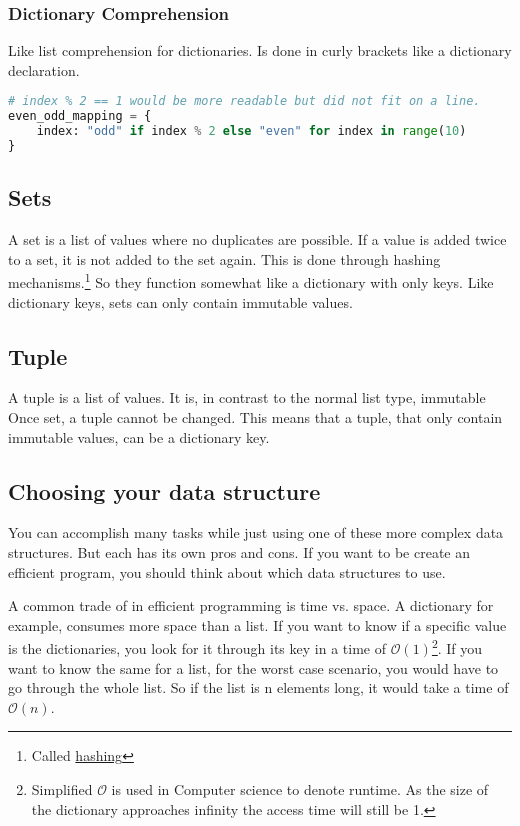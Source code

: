 \documentclass{article}
\begin{document}
\subsubsection{Dictionary Comprehension}

Like list comprehension for dictionaries.
Is done in curly brackets like a dictionary declaration.

\begin{lstlisting}[language=Python]
# index % 2 == 1 would be more readable but did not fit on a line.
even_odd_mapping = {
    index: "odd" if index % 2 else "even" for index in range(10)
}
\end{lstlisting}

\subsection{Sets}

A set is a list of values where no duplicates are possible.
If a value is added twice to a set, it is not added to the set again.
This is done through hashing mechanisms.\footnote{
    Called \href{https://en.wikipedia.org/wiki/Hash_function}{hashing}
}
So they function somewhat like a dictionary with only keys.
Like dictionary keys, sets can only contain immutable values.

\subsection{Tuple}

A tuple is a list of values.
It is, in contrast to the normal list type, immutable
Once set, a tuple cannot be changed.
This means that a tuple, that only contain immutable values, can be a dictionary key.

\subsection{Choosing your data structure}

You can accomplish many tasks while just using one of these more complex data structures.
But each has its own pros and cons.
If you want to be create an efficient program, you should think about which data structures
to use.

A common trade of in efficient programming is time vs. space.
A dictionary for example, consumes more space than a list.
If you want to know if a specific value is the dictionaries, you look for
it through its key in a time of $\mathcal{O}(1)$\footnote{Simplified
    $\mathcal{O}$ is used in Computer science to denote runtime.
    As the size of the dictionary approaches infinity the access time will still be 1.
}.
If you want to know the same for a list, for the worst case scenario, you would
have to go through the whole list.
So if the list is n elements long, it would take a time of $\mathcal{O}(n)$.
\end{document}
